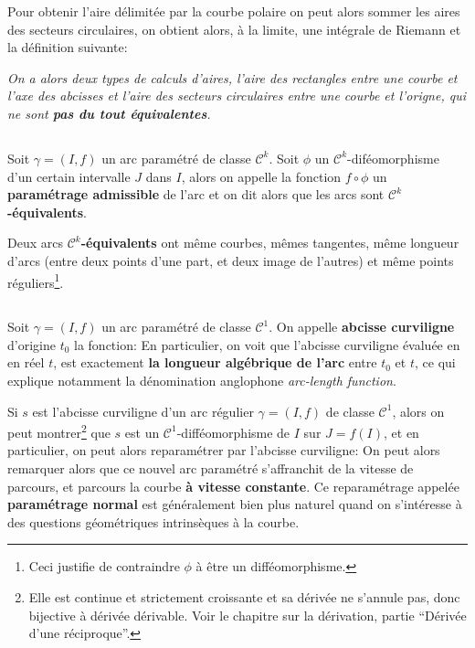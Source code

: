 Pour obtenir l'aire délimitée par la courbe polaire on peut alors sommer les aires des secteurs circulaires, on obtient alors, à la limite, une intégrale de Riemann et la définition suivante:
\begin{center}
   \textit{
      On a alors deux types de calculs d'aires, l'aire des rectangles entre une courbe et l'axe des abcisses et l'aire des secteurs circulaires entre une courbe et l'origne, qui ne sont \textbf{pas du tout équivalentes}.
   }
\end{center}

\subsection*{}
Soit \(\gamma = (I, f)\) un arc paramétré de classe \(\mathcal{C}^k\). Soit \(\phi\) un \(\mathcal{C}^k\)-diféomorphisme d'un certain intervalle \(J\) dans \(I\), alors on appelle la fonction \(f \circ \phi\) un \textbf{paramétrage admissible} de l'arc et on dit alors que les arcs sont \(\mathcal{C}^k\)\textbf{-équivalents}.\<

Deux arcs \(\mathcal{C}^k\)\textbf{-équivalents} ont même courbes, mêmes tangentes, même longueur d'arcs (entre deux points d'une part, et deux image de l'autres) et même points réguliers\footnote[2]{Ceci justifie de contraindre \(\phi\) à être un difféomorphisme.}.

\subsection*{}
Soit \(\gamma = (I, f)\) un arc paramétré de classe \(\mathcal{C}^1\). On appelle \textbf{abcisse curviligne} d'origine \(t_0\) la fonction:
En particulier, on voit que l'abcisse curviligne évaluée en en réel \(t\), est exactement \textbf{la longueur algébrique de l'arc} entre \(t_0\) et \(t\), ce qui explique notamment la dénomination anglophone \textit{arc-length function}.\<

Si \(s\) est l'abcisse curviligne d'un arc régulier \(\gamma = (I, f)\) de classe \(\mathcal{C}^1\), alors on peut montrer\footnote[3]{Elle est continue et strictement croissante et sa dérivée ne s'annule pas, donc bijective à dérivée dérivable. Voir le chapitre sur la dérivation, partie ``Dérivée d'une réciproque''.} que \(s\) est un \(\mathcal{C}^1\)-difféomorphisme de \(I\) sur \(J = f(I)\), et en particulier, on peut alors reparamétrer par l'abcisse curviligne:
On peut alors remarquer alors que ce nouvel arc paramétré s'affranchit de la vitesse de parcours, et parcours la courbe \textbf{à vitesse constante}. Ce reparamétrage appelée \textbf{paramétrage normal} est généralement bien plus naturel quand on s'intéresse à des questions géométriques intrinsèques à la courbe.
